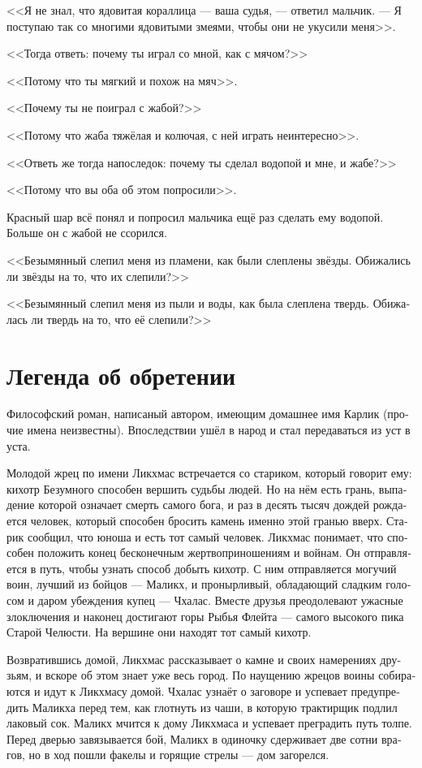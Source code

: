 \documentclass[a4paper,12pt,fleqn]{book}\usepackage{polyglossia}\setdefaultlanguage[babelshorthands=true]{russian}\setotherlanguage{english}\defaultfontfeatures{Ligatures=TeX,Mapping=tex-text}\usepackage{xcolor}\newcommand{\ml}[3]{#2}
\newcommand{\textspace}{\vspace{1em}{\centering\Large\bfseries<...>\par}\vspace{1em}}
\begin{document}
{<<Я не знал, что ядовитая кораллица --- ваша судья, --- ответил мальчик.
--- Я поступаю так со многими ядовитыми змеями, чтобы они не укусили меня>>.

<<Тогда ответь: почему ты играл со мной, как с мячом?>>

<<Потому что ты мягкий и похож на мяч>>.

<<Почему ты не поиграл с жабой?>>

<<Потому что жаба тяжёлая и колючая, с ней играть неинтересно>>.

<<Ответь же тогда напоследок: почему ты сделал водопой и мне, и жабе?>>

<<Потому что вы оба об этом попросили>>.

Красный шар всё понял и попросил мальчика ещё раз сделать ему водопой.
Больше он с жабой не ссорился.

\textspace

<<Безымянный слепил меня из пламени, как были слеплены звёзды.
Обижались ли звёзды на то, что их слепили?>>

<<Безымянный слепил меня из пыли и воды, как была слеплена твердь.
Обижалась ли твердь на то, что её слепили?>>


\section{Легенда об обретении}

Философский роман, написаный автором, имеющим домашнее имя Карлик (прочие имена неизвестны).
Впоследствии ушёл в народ и стал передаваться из уст в уста.

Молодой жрец по имени Ликхмас встречается со стариком, который говорит ему: кихотр Безумного способен вершить судьбы людей.
Но на нём есть грань, выпадение которой означает смерть самого бога, и раз в десять тысяч дождей рождается человек, который способен бросить камень именно этой гранью вверх.
Старик сообщил, что юноша и есть тот самый человек.
Ликхмас понимает, что способен положить конец бесконечным жертвоприношениям и войнам.
Он отправляется в путь, чтобы узнать способ добыть кихотр.
С ним отправляется могучий воин, лучший из бойцов --- Маликх, и пронырливый, обладающий сладким голосом и даром убеждения купец --- Чхалас.
Вместе друзья преодолевают ужасные злоключения и наконец достигают горы Рыбья Флейта --- самого высокого пика Старой Челюсти.
На вершине они находят тот самый кихотр.

Возвратившись домой, Ликхмас рассказывает о камне и своих намерениях друзьям, и вскоре об этом знает уже весь город.
По наущению жрецов воины собираются и идут к Ликхмасу домой.
Чхалас узнаёт о заговоре и успевает предупредить Маликха перед тем, как глотнуть из чаши, в которую трактирщик подлил лаковый сок.
Маликх мчится к дому Ликхмаса и успевает преградить путь толпе.
Перед дверью завязывается бой, Маликх в одиночку сдерживает две сотни врагов, но в ход пошли факелы и горящие стрелы --- дом загорелся.

}
\end{document}
